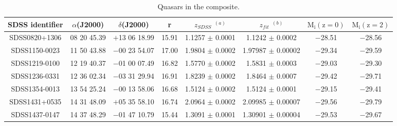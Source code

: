 \begin{table*}
\centering
\begin{center}
\caption{Quasars in the composite.}
\begin{tabular}{cccccccc}
\hline
\noalign{\smallskip}
SDSS identifier & $\alpha$(J2000) & $\delta$(J2000) & r &  $z_{SDSS}$ $^{(a)}$  &  $z_{fit}$ $^{(b)}$ & $\mathrm{M_i (z=0)}$ & $\mathrm{M_i (z=2)}$\\  
\hline

SDSS0820+1306  & 08 20 45.39 & $+$13 06 18.99 & 15.91 & 1.1257 $\pm$ 0.0001 & 1.1242 $\pm$ 0.0002  &   $-$28.51 &   $-$28.56       \\
SDSS1150-0023  & 11 50 43.88 & $-$00 23 54.07 & 17.00 & 1.9804 $\pm$ 0.0002 & 1.97987 $\pm$ 0.00002   &   $-$29.34 &   $-$29.59      \\
SDSS1219-0100  & 12 19 40.37& $-$01 00 07.49& 16.82 & 1.5770 $\pm$ 0.0002  & 1.5831 $\pm$ 0.0003  &   $-$29.03 &  $-$29.30           \\
SDSS1236-0331  & 12 36 02.34 & $-$03 31 29.94 & 16.91 & 1.8239 $\pm$ 0.0002   & 1.8464 $\pm$ 0.0007   &   $-$29.42 &   $-$29.71        \\
SDSS1354-0013  & 13 54 25.24 & $-$00 13 58.06 & 16.68 & 1.5124 $\pm$ 0.0002 & 1.5124 $\pm$  0.0001    &   $-$29.15 &  $-$29.41       \\
SDSS1431+0535  & 14 31 48.09 & $+$05 35 58.10 & 16.74 & 2.0964 $\pm$ 0.0002 & 2.09985 $\pm$  0.00007   &   $-$29.56 &  $-$29.79     \\
SDSS1437-0147  & 14 37 48.29 & $-$01 47 10.79 & 15.44 & 1.3091 $\pm$ 0.0001 & 1.30901 $\pm$  0.00004   &   $-$29.53 &   $-$29.67     \\

\hline
\hline
\end{tabular}
\end{center}


\end{table*}



